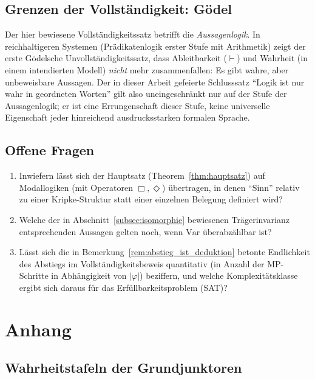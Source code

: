 \documentclass[12pt, a4paper]{article}
\theoremstyle{definition}
\theoremstyle{remark}
\newcommand{\Var}{\mathrm{Var}}
\begin{document}
\subsection{Grenzen der Vollständigkeit: Gödel}
\label{subsec:goedel}

Der hier bewiesene Vollständigkeitssatz betrifft die \emph{Aussagenlogik}. In reichhaltigeren Systemen (Prädikatenlogik erster Stufe mit Arithmetik) zeigt der erste Gödelsche Unvollständigkeitssatz, dass Ableitbarkeit ($\vdash$) und Wahrheit (in einem intendierten Modell) \emph{nicht} mehr zusammenfallen: Es gibt wahre, aber unbeweisbare Aussagen. Der in dieser Arbeit gefeierte Schlusssatz ``Logik ist nur wahr in geordneten Worten'' gilt also uneingeschränkt nur auf der Stufe der Aussagenlogik; er ist eine Errungenschaft dieser Stufe, keine universelle Eigenschaft jeder hinreichend ausdrucksstarken formalen Sprache.

\subsection{Offene Fragen}
\label{subsec:offene_fragen}

\begin{enumerate}[label=(\alph*)]
  \item Inwiefern lässt sich der Hauptsatz (Theorem~\ref{thm:hauptsatz}) auf Modallogiken (mit Operatoren $\Box,\Diamond$) übertragen, in denen ``Sinn'' relativ zu einer Kripke-Struktur statt einer einzelnen Belegung definiert wird?
  \item Welche der in Abschnitt~\ref{subsec:isomorphie} bewiesenen Trägerinvarianz entsprechenden Aussagen gelten noch, wenn $\Var$ überabzählbar ist?
  \item Lässt sich die in Bemerkung~\ref{rem:abstieg_ist_deduktion} betonte Endlichkeit des Abstiegs im Vollständigkeitsbeweis quantitativ (in Anzahl der MP-Schritte in Abhängigkeit von $|\varphi|$) beziffern, und welche Komplexitätsklasse ergibt sich daraus für das Erfüllbarkeitsproblem (SAT)?
\end{enumerate}

\appendix
\section{Anhang}
\label{sec:anhang}

\subsection{Wahrheitstafeln der Grundjunktoren}
\label{app:wahrheitstafeln}
\end{document}
